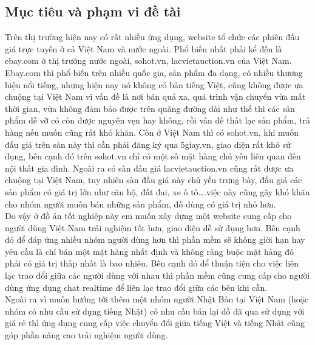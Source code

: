 \documentclass{article}
\begin{document}
\subsection{Mục tiêu và phạm vi đề tài}
Trên thị trường hiện nay có rất nhiều ứng dụng, website tổ chức các phiên đấu giá trực tuyến ở cả Việt Nam và nước ngoài. Phổ biến nhất phải kể đến là ebay.com  ở thị trường nước ngoài, sohot.vn, lacvietauction.vn của Việt Nam. \\
Ebay.com thì phổ biến trên nhiều quốc gia, sản phẩm đa dạng, có nhiều thương hiệu nổi tiếng, nhưng hiện nay nó không có bản tiếng Việt, cũng không được ưa chuộng tại Việt Nam vì vấn đề là nơi bán quá xa, quá trình vận chuyển vừa mất thời gian, vừa không đảm bảo được trên quãng đường dài như thế thì các sản phẩm dễ vỡ có còn được nguyên vẹn hay không, rồi vấn đề thất lạc sản phẩm, trả hàng nếu muốn cũng rất khó khăn. Còn ở Việt Nam thì có sohot.vn, khi muốn đấu giá trên sàn này thì cần phải đăng ký qua 5giay.vn, giao diện rất khó sử dụng, bên cạnh đó trên sohot.vn chỉ có một số mặt hàng chủ yếu liên quan đến nội thất gia đình. Ngoài ra có sàn đấu giá lacvietauction.vn cũng rất được ưa chuộng tại Việt Nam, tuy nhiên sàn đấu giá này chủ yếu trưng bày, đấu giá  các sản phẩm có giá trị lớn như căn hộ, đất đai, xe ô tô….việc này cũng gây khó khăn cho nhóm người muốn bán những sản phẩm, đồ dùng có giá trị nhỏ hơn. \\
Do vậy ở đồ án tốt nghiệp này em muốn xây dựng một website cung cấp cho người dùng Việt Nam trải nghiệm tốt hơn, giao diện dễ sử dụng hơn. Bên cạnh đó để đáp ứng nhiều nhóm người dùng hơn thì phần mềm sẽ không giới hạn hay yêu cầu là chỉ bán một mặt hàng nhất định và không ràng buộc mặt hàng đó phải có giá trị thấp nhất là bao nhiêu. Bên cạnh đó để thuận tiện cho việc liên lạc trao đổi giữa các người dùng với nhau thì phần mềm cũng cung cấp cho người dùng ứng dụng chat realtime để liên lạc trao đổi giữa các bên khi cần. \\
Ngoài ra vì muốn hướng tới thêm một nhóm người Nhật Bản tại Việt Nam (hoặc nhóm có nhu cầu sử dụng tiếng Nhật) có nhu cầu bán lại đồ đã qua sử dụng với giá rẻ thì ứng dụng cung cấp việc chuyển đổi giữa tiếng Việt và tiếng Nhật cũng góp phần nâng cao trải nghiệm người dùng. 
\end{document}
